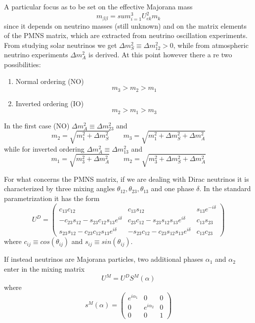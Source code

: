 \documentclass{subnucbo}
\begin{document}
A particular focus as to be set on the effective Majorana mass
\begin{equation}
m_{\beta\beta}=sum_{i=1}^3U_{ek}^2m_k
\end{equation}
since it depends on neutrino masses (still unknown) and on the matrix elements of the PMNS matrix, which are extracted from neutrino oscillation experiments.
From studying solar neutrinos we get $\Delta m_S^2\equiv\Delta m_{12}^2>0$, while from atmospheric neutrino experiments $\Delta m_A^2$ is derived.
At this point however there a re two possibilities:
\begin{enumerate}
\item Normal ordering (NO)
\begin{equation}
m_3>m_2>m_1
\end{equation}
\item Inverted ordering (IO)
\begin{equation}
m_2>m_1>m_3
\end{equation}
\end{enumerate}
In the first case (NO) $\Delta m_A^2\equiv\Delta m_{23}^2$ and
\begin{equation}
m_2=\sqrt{m_1^2+\Delta m_S^2} \qquad m_3=\sqrt{m_1^2+\Delta m_S^2+\Delta m_A^2}
\end{equation}
while for inverted ordering $\Delta m_A^2\equiv\Delta m_{13}^2$ and
\begin{equation}
m_1=\sqrt{m_3^2+\Delta m_A^2} \qquad m_2=\sqrt{m_3^2+\Delta m_S^2+\Delta m_A^2}
\end{equation}

For what concerns the PMNS matrix, if we are dealing with Dirac neutrinos it is characterized by three mixing angles $\theta_{12}, \theta_{23}, \theta_{13}$ and one phase $\delta$. In the standard parametrization it has the form
\begin{equation}
U^D=\begin{pmatrix}c_{13}c_{12}&c_{13}s_{12}&s_{13}e^{-i\delta}\\-c_{23}s_{12}-s_{23}c_{12}s_{13}e^{i\delta}&c_{23}c_{12}-s_{23}s_{12}s_{13}e^{i\delta}&c_{13}s_{23}\\s_{23}s_{12}-c_{23}c_{12}s_{13}e^{i\delta}&-s_{23}c_{12}-c_{23}s_{12}s_{13}e^{i\delta}&c_{13}c_{23}\end{pmatrix}
\end{equation}
where $c_{ij}\equiv cos(\theta_{ij})$ and $s_{ij}\equiv sin(\theta_{ij})$.

If instead neutrinos are Majorana particles, two additional phases $\alpha_1$ and $\alpha_2$ enter in the mixing matrix
\begin{equation}
U^M=U^DS^M(\alpha)
\end{equation}
where
\begin{equation}
s^M(\alpha)=\begin{pmatrix}e^{i\alpha_1}&0&0\\0&e^{i\alpha_2}&0\\0&0&1\end{pmatrix}
\end{equation}
\end{document}
